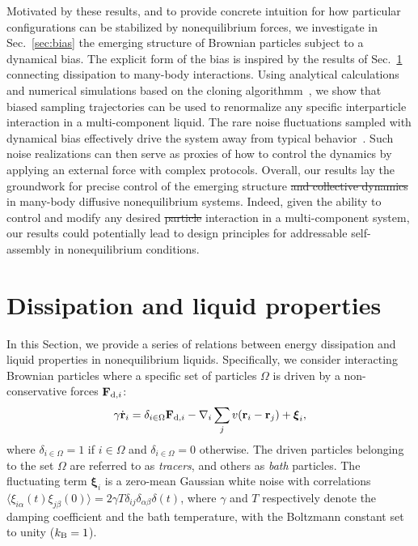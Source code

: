 \documentclass[superscriptaddress, twocolumn, prx, longbibliography, nofootinbib]{revtex4-1}
\providecommand{\DIFaddtex}[1]{{\protect\color{blue}\uwave{#1}}} %
\providecommand{\DIFdeltex}[1]{{\protect\color{red}\sout{#1}}}                      %
\providecommand{\DIFaddbegin}{} %
\providecommand{\DIFaddend}{} %
\providecommand{\DIFdelbegin}{} %
\providecommand{\DIFdelend}{} %
\providecommand{\DIFadd}[1]{\texorpdfstring{\DIFaddtex{#1}}{#1}} %
\providecommand{\DIFdel}[1]{\texorpdfstring{\DIFdeltex{#1}}{}} %
\begin{document}
Motivated by these results, and to provide concrete intuition for how particular configurations can be stabilized by nonequilibrium forces, we investigate in Sec.~\ref{sec:bias} the emerging structure of Brownian particles subject to a dynamical bias. The explicit form of the bias is inspired by the results of Sec.~\ref{sec:method} connecting dissipation to many-body interactions. Using analytical calculations and numerical simulations based on the cloning algorithmm~\cite{Giadina2006, tailleur2007probing, Hurtado2009, Nemoto2016, Ray2018, Klymko2018, Brewer2018}, we show that biased sampling trajectories can be used to renormalize any specific interparticle interaction in a multi-component liquid. The rare noise fluctuations sampled with dynamical bias effectively drive the system away from typical behavior~\cite{garrahan2007, Hedges2009, Jack2010, Pitard2011, Speck2012, Bodineau2012a, Chetrite2013, Limmer2014, Nemoto2017}. Such noise realizations can then serve as proxies of how to control the dynamics by applying an external force with complex protocols. Overall, our results lay the groundwork for precise control of the emerging structure \DIFdelbegin \DIFdel{and collective dynamics }\DIFdelend in many-body diffusive nonequilibrium systems. Indeed, \DIFaddbegin {\DIFaddend given the ability to control and modify any desired \DIFdelbegin \DIFdel{particle }\DIFdelend \DIFaddbegin \DIFadd{interparticle }\DIFaddend interaction in a multi-component system\DIFaddbegin }\DIFaddend , our results could potentially lead to design principles for addressable self-assembly in
nonequilibrium conditions.




\section{Dissipation and liquid properties}\label{sec:method}

In this Section, we provide a series of relations between energy dissipation and liquid properties in nonequilibrium liquids. Specifically, we consider interacting Brownian particles where a specific set of particles $\Omega$ is driven by a non-conservative forces ${\bf F}_{{\rm d},i}$:
\begin{equation}\label{eq:dyn}
	\gamma\dot{\bf r}_i = \delta_{i\in\Omega}{\bf F}_{{\rm d},i} - \nabla_i \sum_j v({\bf r}_i-{\bf r}_j) + {\boldsymbol\xi}_i ,
\end{equation}
where $\delta_{i\in\Omega}=1$ if $i\in\Omega$ and $\delta_{i\in\Omega}=0$ otherwise. The driven particles belonging to the set $\Omega$ are referred to as {\it tracers}, and others as {\it bath} particles. The fluctuating term ${\boldsymbol\xi}_i$ is a zero-mean Gaussian white noise with correlations $\langle\xi_{i\alpha}(t)\xi_{j\beta}(0)\rangle=2\gamma T\delta_{ij}\delta_{\alpha\beta}\delta(t)$, where $\gamma$ and $T$ respectively denote the damping coefficient and the bath temperature, with the Boltzmann constant set to unity ($k_{\rm B}=1$). 
\end{document}
